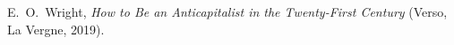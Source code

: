 \documentclass{article}
\begin{document}
\begin{thebibliography}{20}
	
	
	E.\ O.\ Wright, 
	\textit{ How to Be an Anticapitalist in the Twenty-First Century} 
	(Verso, La Vergne, 2019).
	
	
	
	
\end{thebibliography}



















%
%
%
%
%
%
%
%
\end{document}
